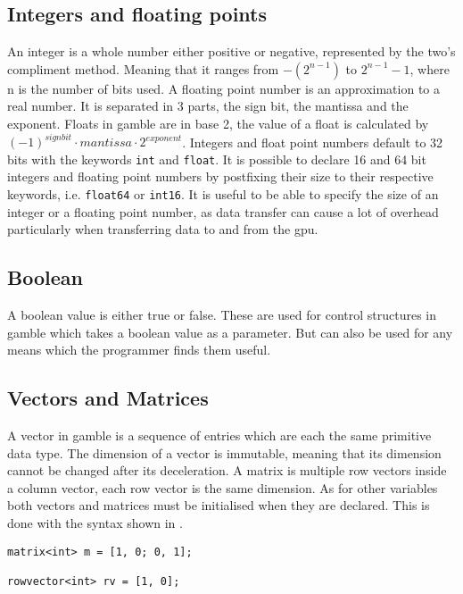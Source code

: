 \subsection*{Integers and floating points}
An integer is a whole number either positive or negative, represented by the two's compliment method. 
Meaning that it ranges from $-(2^{n-1}) $ to $2^{n-1} - 1 $, where n is the number of bits used.
A floating point number is an approximation to a real number. 
It is separated in 3 parts, the sign bit, the mantissa and the exponent. 
Floats in \gls{gamble} are in base 2, the value of a float is calculated by $ (-1)^{sign bit} \cdot mantissa \cdot 2^{exponent} $. 
Integers and float point numbers default to 32 bits with the keywords \texttt{int} and \texttt{float}. 
It is possible to declare 16 and 64 bit integers and floating point numbers by postfixing their size to their respective keywords, i.e. \texttt{float64} or \texttt{int16}. 
It is useful to be able to specify the size of an integer or a floating point number, as data transfer can cause a lot of overhead particularly when transferring data to and from the \acrshort{gpu}. 

\subsection*{Boolean}
A boolean value is either true or false. 
These are used for control structures in \gls{gamble} which takes a boolean value as a parameter. 
But can also be used for any means which the programmer finds them useful. 

\subsection*{Vectors and Matrices}
A vector in \gls{gamble} is a sequence of entries which are each the same primitive data type. 
The dimension of a vector is immutable, meaning that its dimension cannot be changed after its deceleration. 
A matrix is multiple row vectors inside a column vector, each row vector is the same dimension. 
As for other variables both vectors and matrices must be initialised when they are declared. 
This is done with the syntax shown in .

\begin{lstlisting}[caption={Creating a matrix},label={lst:matrix},numbers=none]
matrix<int> m = [1, 0; 0, 1];

rowvector<int> rv = [1, 0];
\end{lstlisting}

